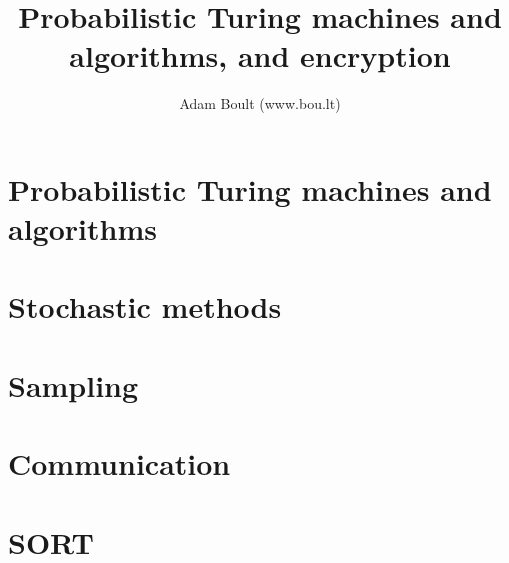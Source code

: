 \documentclass[oneside]{book}
\begin{document}
\author{Adam Boult (www.bou.lt)}
\title{Probabilistic Turing machines and algorithms, and encryption}
\maketitle

\setcounter{tocdepth}{0}
\tableofcontents



\part{Probabilistic Turing machines and algorithms}

\part{Stochastic methods}








\part{Sampling}


\part{Communication}





\part{SORT}

\end{document}
